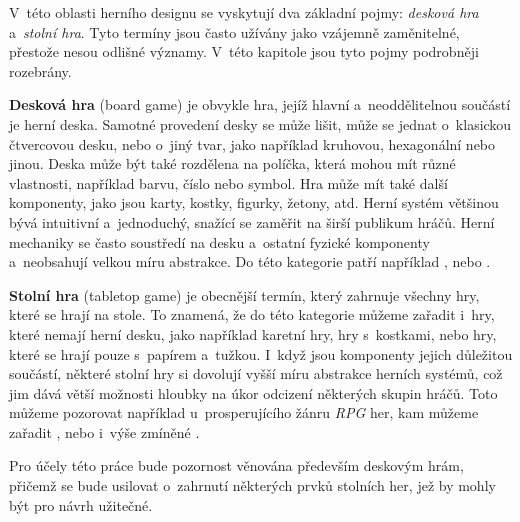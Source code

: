 V~této oblasti herního designu se vyskytují dva základní pojmy: \textit{desková hra} a~\textit{stolní hra}. Tyto termíny jsou často užívány jako vzájemně zaměnitelné, přestože nesou odlišné významy. V~této kapitole jsou tyto pojmy podrobněji rozebrány.

\textbf{Desková hra} (board game) je obvykle hra, jejíž hlavní a~neoddělitelnou součástí je herní deska. Samotné provedení desky se může lišit, může se jednat o~klasickou čtvercovou desku, nebo o~jiný tvar, jako například kruhovou, hexagonální nebo jinou. Deska může být také rozdělena na políčka, která mohou mít různé vlastnosti, například barvu, číslo nebo symbol. Hra může mít také další komponenty, jako jsou karty, kostky, figurky, žetony, atd. Herní systém většinou bývá intuitivní a~jednoduchý, snažící se zaměřit na širší publikum hráčů. Herní mechaniky se často soustředí na desku a~ostatní fyzické komponenty a~neobsahují velkou míru abstrakce. Do této kategorie patří například ,  nebo . \cite{board_game_supply_2023}

\textbf{Stolní hra} (tabletop game) je obecnější termín, který zahrnuje všechny hry, které se hrají na stole. To znamená, že do této kategorie můžeme zařadit i~hry, které nemají herní desku, jako například karetní hry, hry s~kostkami, nebo hry, které se hrají pouze s~papírem a~tužkou. I~když jsou komponenty jejich důležitou součástí, některé stolní hry si dovolují vyšší míru abstrakce herních systémů, což jim dává větší možnosti hloubky na úkor odcizení některých skupin hráčů. Toto můžeme pozorovat například u~prosperujícího žánru \textit{RPG} her, kam můžeme zařadit ,  nebo i~výše zmíněné . \cite{board_game_supply_2023}

Pro účely této práce bude pozornost věnována především deskovým hrám, přičemž se bude usilovat o~zahrnutí některých prvků stolních her, jež by mohly být pro návrh užitečné.
